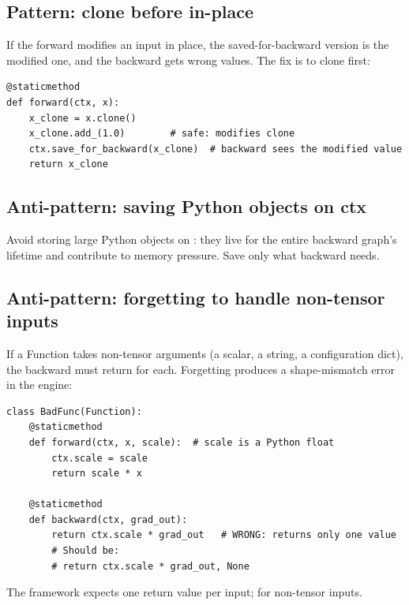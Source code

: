 \subsection{Pattern: clone before in-place}
\label{ssec:custom_functions:clone_before}

If the forward modifies an input in place, the saved-for-backward
version is the modified one, and the backward gets wrong values.
The fix is to clone first:

\begin{lstlisting}[style=lucid,language=LucidPython]
@staticmethod
def forward(ctx, x):
    x_clone = x.clone()
    x_clone.add_(1.0)        # safe: modifies clone
    ctx.save_for_backward(x_clone)  # backward sees the modified value
    return x_clone
\end{lstlisting}

\subsection{Anti-pattern: saving Python objects on ctx}
\label{ssec:custom_functions:anti_pyobj}

Avoid storing large Python objects on : they live for
the entire backward graph's lifetime and contribute to memory
pressure. Save only what backward needs.

\subsection{Anti-pattern: forgetting to handle non-tensor inputs}
\label{ssec:custom_functions:anti_nontensor}

If a Function takes non-tensor arguments (a scalar, a string, a
configuration dict), the backward must return  for
each. Forgetting produces a shape-mismatch error in the engine:

\begin{lstlisting}[style=lucid,language=LucidPython]
class BadFunc(Function):
    @staticmethod
    def forward(ctx, x, scale):  # scale is a Python float
        ctx.scale = scale
        return scale * x

    @staticmethod
    def backward(ctx, grad_out):
        return ctx.scale * grad_out   # WRONG: returns only one value
        # Should be:
        # return ctx.scale * grad_out, None
\end{lstlisting}

The framework expects one return value per input;  for
non-tensor inputs.


